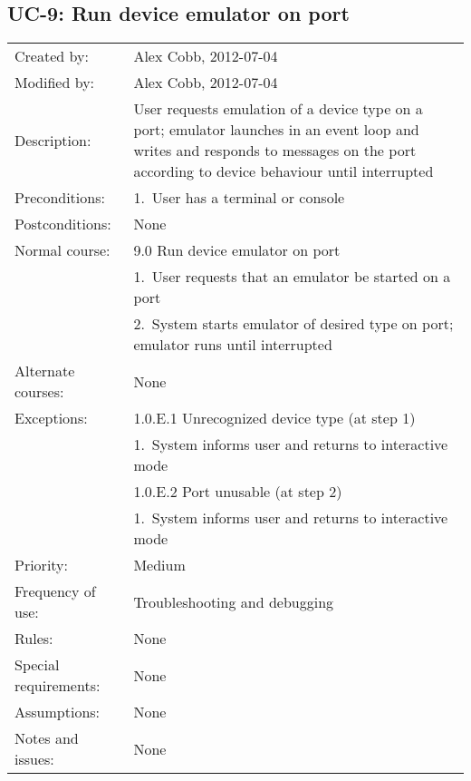 \documentclass[pdftex,oneside,12pt,a4paper]{book}
\begin{document}
\subsection{UC-9: Run device emulator on port}
\begin{tabular}{|l|p{10cm}|}\hline
Created by: & Alex Cobb, 2012-07-04 \\
Modified by: & Alex Cobb, 2012-07-04 \\\hline
Description: & User requests emulation of a device type on a port; emulator launches in an event loop and writes and responds to messages on the port according to device behaviour until interrupted \\\hline
Preconditions: & 1.\ User has a terminal or console \\\hline
Postconditions: & None \\\hline
Normal course: & 9.0 Run device emulator on port\\
 & 1.\ User requests that an emulator be started on a port \\
 & 2.\ System starts emulator of desired type on port; emulator runs until interrupted\\\hline
Alternate courses: & None\\\hline
Exceptions: & 1.0.E.1 Unrecognized device type (at step 1) \\
 & 1.\ System informs user and returns to interactive mode\\\cline{2-2}
 & 1.0.E.2 Port unusable (at step 2)\\
 & 1.\ System informs user and returns to interactive mode\\\hline
Priority: & Medium \\\hline
Frequency of use: & Troubleshooting and debugging\\\hline
Rules: & None\\\hline
Special requirements: & None\\\hline
Assumptions: & None\\\hline
Notes and issues: & None\\\hline
\end{tabular}
\end{document}
